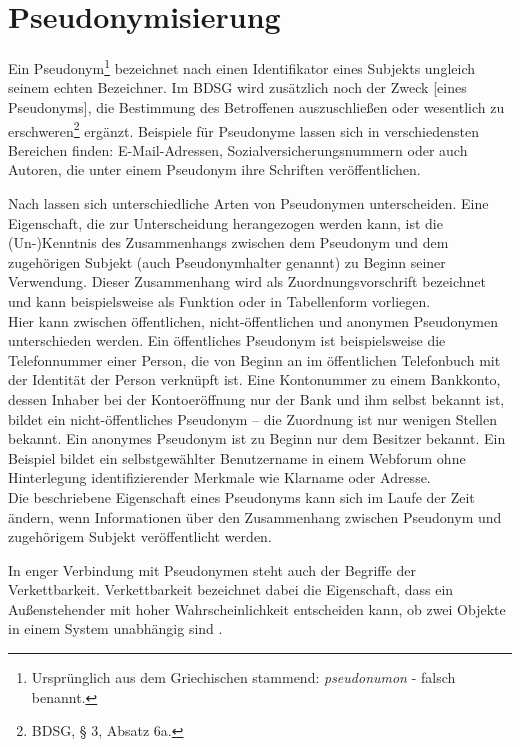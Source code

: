 \section{Pseudonymisierung}

\label{sec_basics_pseudonymity}

Ein Pseudonym\footnote{
	Ursprünglich aus dem Griechischen stammend: \textit{pseudonumon} - falsch benannt.
} bezeichnet nach \cite{pfitzmann2010} einen Identifikator eines Subjekts ungleich seinem echten Bezeichner. Im BDSG wird zusätzlich noch der \glqq Zweck [eines Pseudonyms], die Bestimmung des Betroffenen auszuschließen oder wesentlich zu erschweren\grqq{}\footnote{
  BDSG, § 3, Absatz 6a.
} ergänzt. Beispiele für Pseudonyme lassen sich in verschiedensten Bereichen finden: E-Mail-Adressen, Sozialversicherungsnummern oder auch Autoren, die unter einem Pseudonym ihre Schriften veröffentlichen.

Nach \cite{pfitzmann1990} lassen sich unterschiedliche Arten von Pseudonymen unterscheiden. Eine Eigenschaft, die zur Unterscheidung herangezogen werden kann, ist die (Un-)Kenntnis des Zusammenhangs zwischen dem Pseudonym und dem zugehörigen Subjekt (auch Pseudonymhalter genannt) zu Beginn seiner Verwendung. Dieser Zusammenhang wird als Zuordnungsvorschrift bezeichnet und kann beispielsweise als Funktion oder in Tabellenform vorliegen.\\
Hier kann zwischen öffentlichen, nicht-öffentlichen und anonymen Pseudonymen unterschieden werden. Ein öffentliches Pseudonym ist beispielsweise die Telefonnummer einer Person, die von Beginn an im öffentlichen Telefonbuch mit der Identität der Person verknüpft ist. Eine Kontonummer zu einem Bankkonto, dessen Inhaber bei der Kontoeröffnung nur der Bank und ihm selbst bekannt ist, bildet ein nicht-öffentliches Pseudonym -- die Zuordnung ist nur wenigen Stellen bekannt. Ein anonymes Pseudonym ist zu Beginn nur dem Besitzer bekannt. Ein Beispiel bildet ein selbstgewählter Benutzername in einem Webforum ohne Hinterlegung identifizierender Merkmale wie Klarname oder Adresse.\\
Die beschriebene Eigenschaft eines Pseudonyms kann sich im Laufe der Zeit ändern, wenn Informationen über den Zusammenhang zwischen Pseudonym und zugehörigem Subjekt veröffentlicht werden.

In enger Verbindung mit Pseudonymen steht auch der Begriffe der Verkettbarkeit. 
Verkettbarkeit bezeichnet dabei die Eigenschaft, dass ein Außenstehender mit hoher Wahrscheinlichkeit entscheiden kann, ob zwei Objekte in einem System unabhängig sind \cite{pfitzmann2010}.

